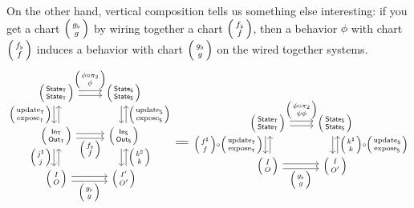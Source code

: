 \documentclass[DynamicalBook]{subfiles}
\begin{document}
On the other hand, vertical composition tells us something else interesting: if
you get a chart $\lens{g_{\flat}}{g}$ by wiring together a chart
$\lens{f_{\flat}}{f}$, then a behavior $\phi$ with
chart $\lens{f_{\flat}}{f}$ induces a behavior with chart $\lens{g_{\flat}}{g}$
on the wired together systems.
\[
  \begin{tikzcd}
    \lens{\State{T}}{\State{T}} \ar[r, shift left, "\lens{\phi \circ
      \pi_2}{\phi}"] \ar[r, shift right] \ar[d, shift right,
    "\lens{\update{T}}{\expose{T}}"'] \ar[d, shift left, leftarrow] &
    \lens{\State{S}}{\State{S}} \ar[d, shift left, leftarrow,
    "\lens{\update{S}}{\expose{S}}"] \ar[d, shift right]\\
    \lens{\In{T}}{\Out{T}} \ar[d, shift right, "\lens{j^{\sharp}}{j}"'] \ar[d, shift left,
        leftarrow] \ar[r, shift right, "\lens{f_{\flat}}{f}"']
    \ar[r, shift left] & \lens{\In{S}}{\Out{S}} \ar[d, shift left, leftarrow,
        "\lens{k^{\sharp}}{k}"] \ar[d, shift right]\\
    \lens{I}{O} \ar[r, shift right, "\lens{g_{\flat}}{g}"']
    \ar[r, shift left] & \lens{I'}{O'} \\
  \end{tikzcd} \xequals{\quad}
  \begin{tikzcd}
    \lens{\State{T}}{\State{T}} \ar[r, shift left, "\lens{\phi \circ
      \pi_2}{\psi\phi}"] \ar[r, shift right] \ar[d, shift right,
    "\lens{f^{\sharp}}{f} \circ \lens{\update{T}}{\expose{T}}"'] \ar[d, shift left, leftarrow] &
    \lens{\State{S}}{\State{S}} \ar[d, shift left, leftarrow,
    "\lens{k^{\sharp}}{k} \circ \lens{\update{S}}{\expose{S}}"] \ar[d, shift right]\\
    \lens{I}{O} \ar[r, shift right, "\lens{g_{\flat}}{g}"']
    \ar[r, shift left] & \lens{I}{O'}
  \end{tikzcd}
\]
\end{document}
